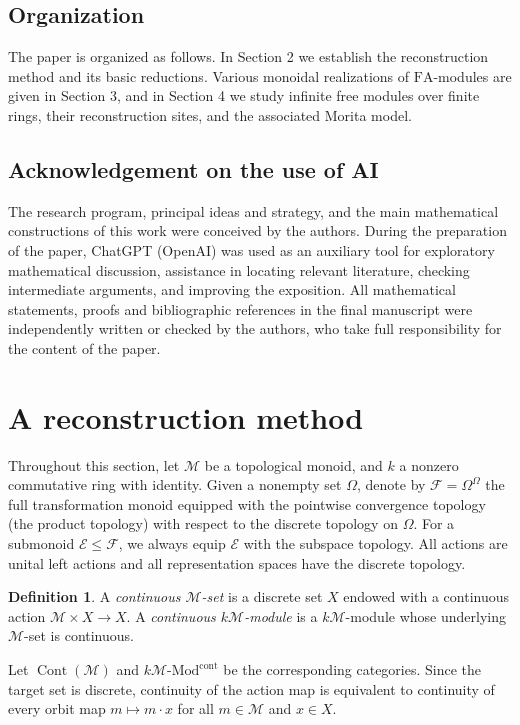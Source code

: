 \documentclass[10pt, reqno]{amsart}
\theoremstyle{plain}
\numberwithin{equation}{section}
\theoremstyle{definition}
\newtheorem{definition}[theorem]{Definition}
\newcommand{\Mod}{{\textrm{-}\mathrm{Mod}}}
\newcommand{\Cont}{\operatorname{Cont}}
\newcommand{\FA}{\mathrm{FA}}
\newcommand{\M}{\mathscr M}
\newcommand{\E}{\mathscr E}
\begin{document}
\subsection{Organization}

The paper is organized as follows. In Section 2 we establish the reconstruction method and its basic reductions. Various monoidal realizations of $\FA$-modules are given in Section 3, and in Section 4 we study infinite free modules over finite rings, their reconstruction sites, and the associated Morita model.

\subsection{Acknowledgement on the use of AI}

The research program, principal ideas and strategy, and the main mathematical constructions of this work were conceived by the authors. During the preparation of the paper, ChatGPT (OpenAI) was used as an auxiliary tool for exploratory mathematical discussion, assistance in locating relevant literature, checking intermediate arguments, and improving the exposition. All mathematical statements, proofs and bibliographic references in the final manuscript were independently written or checked by the authors, who take full responsibility for the content of the paper.


\section{A reconstruction method}

Throughout this section, let $\M$ be a topological monoid, and $k$ a nonzero commutative ring with identity. Given a nonempty set $\Omega$, denote by $\mathscr{F} = \Omega^{\Omega}$ the full transformation monoid equipped with the pointwise convergence topology (the product topology) with respect to the discrete topology on $\Omega$. For a submonoid $\E \leqslant \mathscr{F}$, we always equip $\E$ with the subspace topology. All actions are unital left actions and all representation spaces have the discrete topology.

\begin{definition}
A \emph{continuous $\M$-set} is a discrete set $X$ endowed with a continuous action $\M \times X \to X$. A \emph{continuous $k\M$-module} is a $k\M$-module whose underlying $\M$-set is continuous.
\end{definition}

Let $\Cont(\M)$ and $k\M \Mod^{\mathrm{cont}}$ be the corresponding categories. Since the target set is discrete, continuity of the action map is equivalent to continuity of every orbit map $m \mapsto m \cdot x$ for all $m \in \M$ and $x \in X$.
\end{document}
